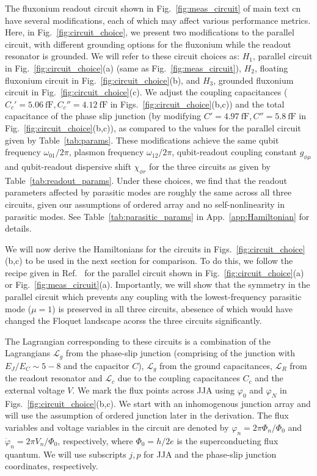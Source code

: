 \documentclass[%
reprint,
superscriptaddress,
 amsmath,amssymb,
 aps,
 prx,
longbibliography,
floatfix,
]{revtex4-2}
\begin{document}
The fluxonium readout circuit shown in Fig.~\ref{fig:meas_circuit} of main text cn have several modifications, each of which may affect various performance metrics. Here, in Fig.~\ref{fig:circuit_choice}, we present two modifications to the parallel circuit, with different grounding options for the fluxonium while the readout resonator is grounded. We will refer to these circuit choices as: $H_1$, parallel circuit in Fig.~\ref{fig:circuit_choice}(a) (same as Fig.~\ref{fig:meas_circuit}), $H_2$, floating fluxonium circuit in Fig.~\ref{fig:circuit_choice}(b), and $H_3$, grounded fluxonium circuit in Fig.~\ref{fig:circuit_choice}(c). We adjust the coupling capacitances ($C_c'=5.06 \ \mathrm{fF},C_c''=4.12 \ \mathrm{fF}$ in Figs.~\ref{fig:circuit_choice}(b,c)) and the total capacitance of the phase slip junction (by modifying $C'=4.97 \ \mathrm{fF},C''=5.8 \ \mathrm{fF}$ in Fig.~\ref{fig:circuit_choice}(b,c)), as compared to the values for the parallel circuit given by Table~\ref{tab:params}. These modifications achieve the same qubit frequency $\omega_{01}/2\pi$, plasmon frequency $\omega_{12}/2\pi$, qubit-readout coupling constant $g_{\phi \mu}$ and qubit-readout dispersive shift $\chi_{\phi r}$ for the three circuits as given by Table~\ref{tab:readout_params}. Under these choices, we find that the readout parameters affected by parasitic modes are roughly the same across all three circuits, given our assumptions of ordered array and no self-nonlinearity in parasitic modes. See Table~\ref{tab:parasitic_params} in App.~\ref{app:Hamiltonian} for details. 


We will now derive the Hamiltonians for the circuits in Figs.~\ref{fig:circuit_choice}(b,c) to be used in the next section for comparison. To do this, we follow the recipe given in Ref.~\cite{viola2015collective} for the parallel circuit shown in Fig.~\ref{fig:circuit_choice}(a) or Fig.~\ref{fig:meas_circuit}(a). Importantly, we will show that the symmetry in the parallel circuit which prevents any coupling with the lowest-frequency parasitic mode ($\mu=1$) is preserved in all three circuits, abesence of which would have changed the Floquet landscape acorss the three circuits significantly. 

The Lagrangian corresponding to these circuits is a combination of the Lagrangians $\mathcal{L}_g$ from the phase-slip junction (comprising of the junction with $E_J/E_C\sim 5-8$ and the capacitor $C$), $\mathcal{L}_{g}$ from the ground capacitances, $\mathcal{L}_{R}$ from the readout resonator and $\mathcal{L}_c$ due to the coupling capacitances $C_c$ and the external voltage $V$. We mark the flux points across JJA using $\varphi_0$ and $\varphi_{N}$ in Figs.~\ref{fig:circuit_choice}(b,c). We start with an inhomogenous junction array and will use the assumption of ordered junction later in the derivation. The flux variables and voltage variables in the circuit are denoted by $\varphi_n=2\pi\Phi_n/\Phi_0$ and $\dot{\varphi}_n=2\pi V_n/\Phi_0$, respectively, where $\Phi_0=h/2e$ is the superconducting flux quantum. We will use subscripts $j, p$ for JJA and the phase-slip junction coordinates, respectively.
\end{document}
